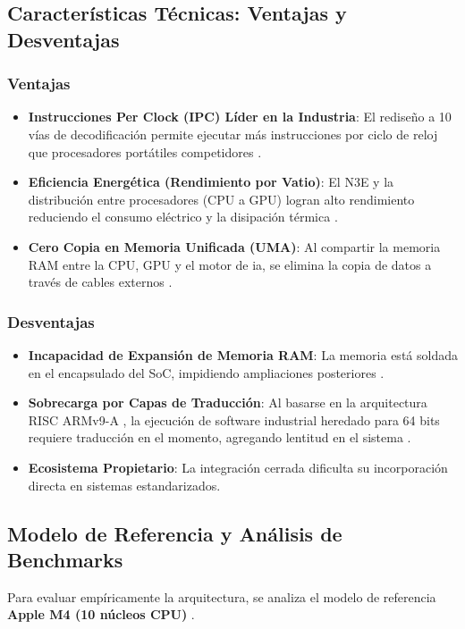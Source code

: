\documentclass[12pt,a4paper]{article}
\begin{document}
\subsection{Características Técnicas: Ventajas y Desventajas}

\subsubsection{Ventajas}
\begin{itemize}[leftmargin=*]
    \item \textbf{Instrucciones Per Clock (IPC) Líder en la Industria}: El rediseño a 10 vías de decodificación permite ejecutar más instrucciones por ciclo de reloj que procesadores portátiles competidores \cite{apple_m4}.
    \item \textbf{Eficiencia Energética (Rendimiento por Vatio)}: El N3E y la distribución entre procesadores (CPU a GPU) logran alto rendimiento reduciendo el consumo eléctrico y la disipación térmica \cite{apple_m4}.
    \item \textbf{Cero Copia en Memoria Unificada (UMA)}: Al compartir la memoria RAM entre la CPU, GPU y el motor de ia, se elimina la copia de datos a través de cables externos \cite{apple_m4}.
\end{itemize}

\subsubsection{Desventajas}
\begin{itemize}[leftmargin=*]
    \item \textbf{Incapacidad de Expansión de Memoria RAM}: La memoria está soldada en el encapsulado del SoC, impidiendo ampliaciones posteriores \cite{apple_m4}.
    \item \textbf{Sobrecarga por Capas de Traducción}: Al basarse en la arquitectura RISC ARMv9-A \cite{armv9}, la ejecución de software industrial heredado para 64 bits requiere traducción en el momento, agregando lentitud en el sistema \cite{apple_m4}.
    \item \textbf{Ecosistema Propietario}: La integración cerrada dificulta su incorporación directa en sistemas estandarizados.
\end{itemize}

\subsection{Modelo de Referencia y Análisis de Benchmarks}
Para evaluar empíricamente la arquitectura, se analiza el modelo de referencia \textbf{Apple M4 (10 núcleos CPU)} \cite{apple_m4}.
\end{document}
